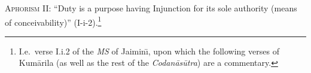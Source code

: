 ﻿\documentclass[11pt]{amsart}
\newcommand{\tab}{\hspace*{1em}}
\begin{document}







\noindent\textsc{Aphorism II:} ``Duty is a purpose having Injunction for its sole authority (means of conceivability)'' (I-i-2).\footnote{I.e.~verse I.i.2 of the \emph{MS} of Jaimin\={\i}, upon which the following verses of Kum\=arila (as well as the rest of the \emph{Codan\=as\=utra}) are a commentary.}\footnotesize\small


\nocite{jha1937tattvasangraha}
\nocite{sepkumarila}



\end{document}
